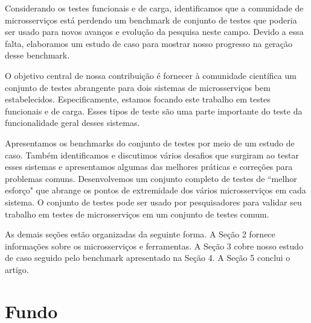 
Considerando os testes funcionais e de carga, identificamos que a comunidade de microsserviços está perdendo um benchmark de conjunto de testes que poderia ser usado para novos avanços e evolução da pesquisa neste campo. Devido a essa falta, elaboramos um estudo de caso para mostrar nosso progresso na geração desse benchmark.

O objetivo central de nossa contribuição é fornecer à comunidade científica um conjunto de testes abrangente para dois sistemas de microsserviços bem estabelecidos. Especificamente, estamos focando este trabalho em testes funcionais e de carga. Esses tipos de teste são uma parte importante do teste da funcionalidade geral desses sistemas.

Apresentamos os benchmarks do conjunto de testes por meio de um estudo de caso. Também identificamos e discutimos vários desafios que surgiram ao testar esses sistemas e apresentamos algumas das melhores práticas e correções para problemas comuns. Desenvolvemos um conjunto completo de testes de ``melhor esforço" que abrange os pontos de extremidade dos vários microsserviços em cada sistema. O conjunto de testes pode ser usado por pesquisadores para validar seu trabalho em testes de microsserviços em um conjunto de testes comum.

As demais seções estão organizadas da seguinte forma. A Seção 2 fornece informações sobre os microsserviços e ferramentas. A Seção 3 cobre nosso estudo de caso seguido pelo benchmark apresentado na Seção 4. A Seção 5 conclui o artigo.

\section{Fundo}\label{sec:fundo}

